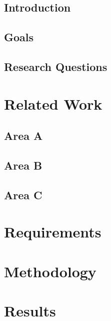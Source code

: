 \documentclass{acmart}
\begin{document}
\subsection{Introduction} %

\subsection{Goals}

\subsection{Research Questions}

\section{Related Work} %

\subsection{Area A} 

\subsection{Area B}

\subsection{Area C}

\section{Requirements} %

\section{Methodology}

\section{Results} %
\end{document}

